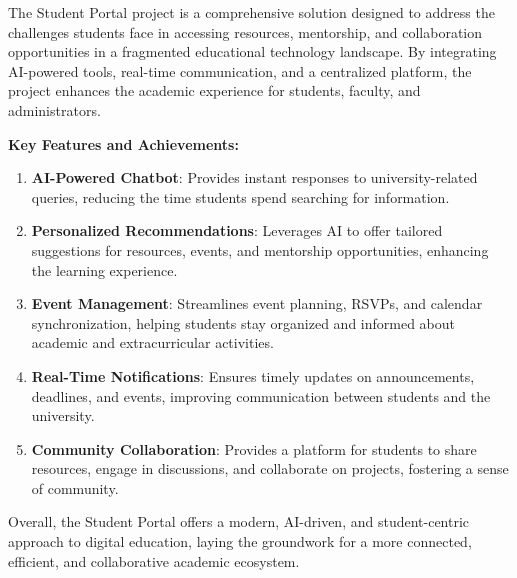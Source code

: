 The Student Portal project is a comprehensive solution designed to address the challenges students face in accessing resources, mentorship, and collaboration opportunities in a fragmented educational technology landscape. By integrating AI-powered tools, real-time communication, and a centralized platform, the project enhances the academic experience for students, faculty, and administrators.

\textbf{Key Features and Achievements:}
\begin{enumerate}
  \item \textbf{AI-Powered Chatbot}: Provides instant responses to university-related queries, reducing the time students spend searching for information.

  \item \textbf{Personalized Recommendations}: Leverages AI to offer tailored suggestions for resources, events, and mentorship opportunities, enhancing the learning experience.

  \item \textbf{Event Management}: Streamlines event planning, RSVPs, and calendar synchronization, helping students stay organized and informed about academic and extracurricular activities.

  \item \textbf{Real-Time Notifications}: Ensures timely updates on announcements, deadlines, and events, improving communication between students and the university.

  \item \textbf{Community Collaboration}: Provides a platform for students to share resources, engage in discussions, and collaborate on projects, fostering a sense of community.
\end{enumerate}

Overall, the Student Portal offers a modern, AI-driven, and student-centric approach to digital education, laying the groundwork for a more connected, efficient, and collaborative academic ecosystem.

\vspace{10cm}


